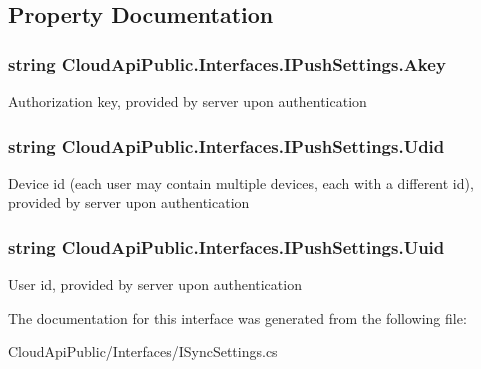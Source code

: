 \subsection{Property Documentation}
\hypertarget{interface_cloud_api_public_1_1_interfaces_1_1_i_push_settings_abfa1e9703bcce312750e8fdb2e042186}{
\subsubsection[{Akey}]{\setlength{\rightskip}{0pt plus 5cm}string Cloud\-Api\-Public.\-Interfaces.\-I\-Push\-Settings.\-Akey\hspace{0.3cm}{\ttfamily [get]}}}\label{interface_cloud_api_public_1_1_interfaces_1_1_i_push_settings_abfa1e9703bcce312750e8fdb2e042186}


Authorization key, provided by server upon authentication 

\hypertarget{interface_cloud_api_public_1_1_interfaces_1_1_i_push_settings_a959eb97596da80de2ceca9f042ce6ae8}{
\subsubsection[{Udid}]{\setlength{\rightskip}{0pt plus 5cm}string Cloud\-Api\-Public.\-Interfaces.\-I\-Push\-Settings.\-Udid\hspace{0.3cm}{\ttfamily [get]}}}\label{interface_cloud_api_public_1_1_interfaces_1_1_i_push_settings_a959eb97596da80de2ceca9f042ce6ae8}


Device id (each user may contain multiple devices, each with a different id), provided by server upon authentication 

\hypertarget{interface_cloud_api_public_1_1_interfaces_1_1_i_push_settings_aa7bd7078a4563c343168024933fa1d98}{
\subsubsection[{Uuid}]{\setlength{\rightskip}{0pt plus 5cm}string Cloud\-Api\-Public.\-Interfaces.\-I\-Push\-Settings.\-Uuid\hspace{0.3cm}{\ttfamily [get]}}}\label{interface_cloud_api_public_1_1_interfaces_1_1_i_push_settings_aa7bd7078a4563c343168024933fa1d98}


User id, provided by server upon authentication 



The documentation for this interface was generated from the following file\-:\begin{DoxyCompactItemize}
\item 
Cloud\-Api\-Public/\-Interfaces/I\-Sync\-Settings.\-cs\end{DoxyCompactItemize}
